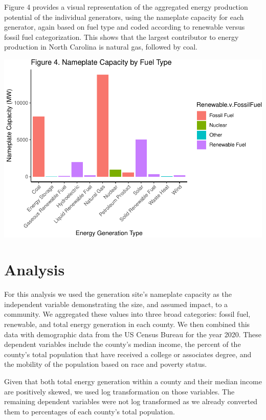 \documentclass[
  12pt,
]{article}
\begin{document}
Figure 4 provides a visual representation of the aggregated energy
production potential of the individual generators, using the nameplate
capacity for each generator, again based on fuel type and coded
according to renewable versus fossil fuel categorization. This shows
that the largest contributor to energy production in North Carolina is
natural gas, followed by coal.

\includegraphics{Project_files/figure-latex/unnamed-chunk-4-1.pdf}

\newpage

\hypertarget{analysis}{%
\section{Analysis}\label{analysis}}

For this analysis we used the generation site's nameplate capacity as
the independent variable demonstrating the size, and assumed impact, to
a community. We aggregated these values into three broad categories:
fossil fuel, renewable, and total energy generation in each county. We
then combined this data with demographic data from the US Census Bureau
for the year 2020. These dependent variables include the county's median
income, the percent of the county's total population that have received
a college or associates degree, and the mobility of the population based
on race and poverty status.

Given that both total energy generation within a county and their median
income are positively skewed, we used log transformation on those
variables. The remaining dependent variables were not log transformed as
we already converted them to percentages of each county's total
population.
\end{document}
